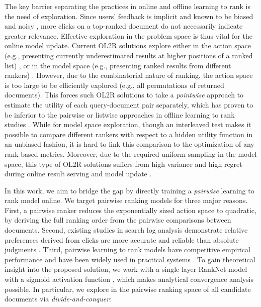 The key barrier separating the practices in online and offline learning to rank is the need of exploration. Since users' feedback is implicit and known to be biased and noisy \cite{joachims2005accurately,agichtein2006improving,joachims2007evaluating}, more clicks on a top-ranked document do not necessarily indicate greater relevance. Effective exploration in the problem space is thus vital for the online model update. 
Current OL2R solutions explore either in the action space (e.g., presenting currently underestimated results at higher positions of a ranked list) \cite{radlinski2008learning,kveton2015cascading,zoghi2017online,lattimore2018toprank}, or in the model space (e.g., presenting ranked results from different rankers)  \cite{yue2009interactively,schuth2014multileaved}. 
However, due to the combinatorial nature of ranking, the action space is too large to be efficiently explored (e.g., all permutations of returned documents). This forces such OL2R solutions to take a \emph{pointwise} approach to estimate the utility of each query-document pair separately, which has proven to be inferior to the pairwise or listwise approaches in offline learning to rank studies \cite{chapelle2011yahoo}. While for model space exploration,
though an interleaved test makes it possible to compare different rankers with respect to a hidden utility function in an unbiased fashion, it is hard to link this comparison to the optimization of any rank-based metrics. Moreover, due to the required uniform sampling in the model space, this type of OL2R solutions suffers from high variance and high regret during online result serving and model update \cite{wang2019variance}. 

In this work, we aim to bridge the gap by directly training a \emph{pairwise} learning to rank model online. We target pairwise ranking models for three major reasons. First, a pairwise ranker reduces the exponentially sized action space to quadratic, by deriving the full ranking order from the pairwise comparisons between documents. Second, existing studies in search log analysis demonstrate relative preferences derived from clicks are more accurate and reliable than absolute judgments \cite{joachims2005accurately,joachims2007evaluating}. Third, pairwise learning to rank models have competitive empirical performance and have been widely used in practical systems \cite{chapelle2011yahoo,joachims2002optimizing,burges2010ranknet}. 
To gain theoretical insight into the proposed solution, we work with a single layer RankNet model with a sigmoid activation function \cite{burges2010ranknet}, which makes analytical convergence analysis possible. In particular, we explore in the pairwise ranking space of all candidate documents via \emph{divide-and-conquer}: 



